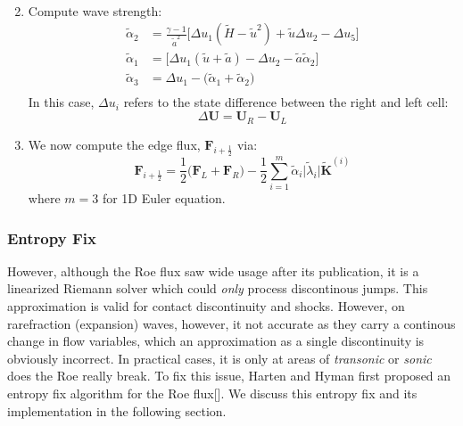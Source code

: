\documentclass[a4paper]{article}
\numberwithin{equation}{section}
\begin{document}
\begin{enumerate}
\begin{equation}
\begin{split}
        \end{split}
    \end{equation}
    \item  Compute wave strength:
    \begin{equation}
        \begin{split}
            \tilde{\alpha}_2 &= \frac{\gamma - 1}{\tilde{a}^2} \bigg[\Delta u_1 (\tilde{H} - \tilde{u}^2) + \tilde{u} \Delta u_2 - \Delta u_5    \bigg]\\
            \tilde{\alpha}_1 &= \bigg[\Delta u_1 (\tilde{u} + \tilde{a})  - \Delta u_2 - \tilde{a} \tilde{\alpha}_2\bigg]\\
            \tilde{\alpha}_3 &= \Delta u_1 - \bigl(\tilde{\alpha}_1 + \tilde{\alpha}_2 \bigr)\\
        \end{split}
    \end{equation}
    In this case, $\Delta u_i$ refers to the state difference between the right and left cell:
    \begin{equation}
        \Delta \mathbf{U} = \mathbf{U}_R - \mathbf{U}_L
    \end{equation}
    \item We now compute the edge flux, $\mathbf{F}_{i + \frac{1}{2}}$ via:
    \begin{equation}\label{eq:Roe Edge Flux}
        \mathbf{F}_{i + \frac{1}{2}} = \frac{1}{2} \bigl(\mathbf{F}_L + \mathbf{F}_R\bigr) - \frac{1}{2} \sum_{i = 1}^{m} \tilde{\alpha}_i \big|\tilde{\lambda}_i\big| \tilde{\mathbf{K}}^{(i)} 
    \end{equation}
    where $m = 3$ for 1D Euler equation. 
\end{enumerate}
\subsubsection{Entropy Fix}
However, although the Roe flux saw wide usage after its publication, it is a linearized Riemann solver which could \textit{only} process discontinous jumps. This approximation is valid for contact discontinuity and shocks. However, on rarefraction (expansion) waves, however, it not accurate as they carry a continous change in flow variables, which an approximation as a single discontinuity is obviously incorrect. In practical cases, it is only at areas of \textit{transonic} or \textit{sonic} does the Roe really break. To fix this issue, Harten and Hyman first proposed an entropy fix algorithm for the Roe flux[]. We discuss this entropy fix and its implementation in the following section.
\end{document}
